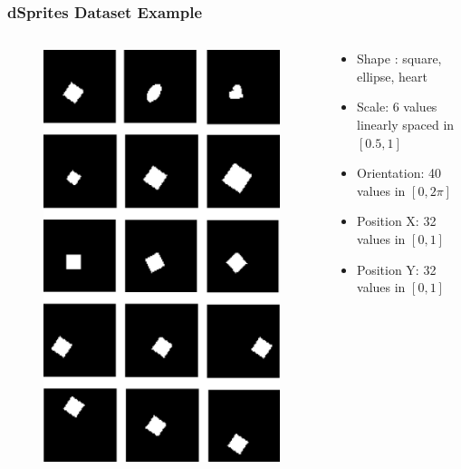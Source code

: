 \documentclass[10pt,mathserif]{beamer}
\begin{document}
\begin{frame}
\frametitle{dSprites Dataset Example}
\begin{columns}
\begin{column}{0.35\textwidth}
\begin{figure}
\includegraphics[width=\linewidth]{dis_asset/dsprites}
\end{figure}
\end{column}
\begin{column}{0.65\textwidth}
\begin{itemize}\itemsep=26pt
\item Shape {\color{red}{(discrete)}} : square, ellipse, heart
\item Scale: 6 values linearly spaced in $[0.5, 1]$
\item Orientation: 40 values in $[0, 2\pi]$
\item Position X: 32 values in $[0, 1]$
\item Position Y: 32 values in $[0, 1]$

\end{itemize}
\end{column}
\end{columns}

\end{frame}
\end{document}

